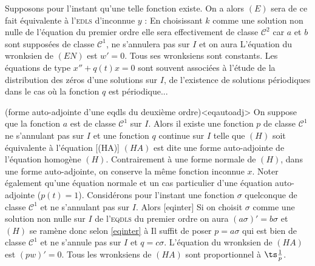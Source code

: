 \begin{remas}
\dem Supposons pour l'instant qu'une telle fonction existe. On a alors
$(E)$ sera de ce fait équivalente à l'\textsc{edls} d'inconnue $y$ :
En choisissant $k$ comme une solution non nulle de l'équation du premier ordre
elle sera effectivement de classe $\mathcal C^2$ car $a$ et $b$ sont supposées de classe $\mathcal C^1$, ne s'annulera pas sur $I$ et on aura
\enddem
\nb L'équation du wronksien de $(EN)$ est $w'=0$. Tous ses wronksiens sont constants.
\endnb
\nb Les équations de type $x''+q(t)x=0$ sont souvent associées à l'étude de la distribution des zéros d'une solutions sur $I$, de l'existence de solutions périodiques dans le cas où la fonction $q$ est périodique...
\endnb

\unite(forme auto-adjointe d'une eqdls du deuxième ordre)<eqautoadj>
On suppose que la fonction $a$ est de classe $\mathcal C^1$ sur $I$. Alors il existe une fonction $p$ de classe $\mathcal C^1$ ne s'annulant pas sur $I$ et une fonction $q$ continue sur $I$ telle que $(H)$ soit équivalente à l'équation
[(HA)]
$(HA)$ est dite une forme auto-adjointe de l'équation homogène $(H)$.
\nb Contrairement à une forme normale de $(H)$, dans une forme auto-adjointe, on conserve la même fonction inconnue $x$. Noter également qu'une équation normale et un cas particulier d'une équation auto-adjointe ($p(t)=1$).
\endnb
\dem Considérons pour l'instant une fonction $\sigma$ quelconque de classe $\mathcal C^1$ et ne s'annulant pas sur $I$. Alors
[eqinter]
Si on choisit $\sigma$ comme une solution non nulle sur $I$ de l'\textsc{eqdls} du premier ordre
on aura $(a\sigma)'=b\sigma$ et $(H)$ se ramène donc selon \eqref{eqinter}  à
Il suffit  de poser $p=a\sigma$ qui est bien de classe $\mathcal C^1$ et ne s'annule pas sur $I$ et $q=c\sigma$.
\enddem
\nb
L'équation du wronksien de $(HA)$ est $(pw)'=0$. Tous les wronksiens de $(HA)$ sont proportionnel à $\ts\frac1p$.
\endnb


\end{remas}
